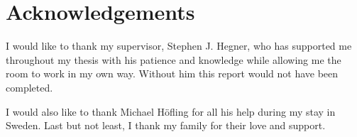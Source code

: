 \chapter{Acknowledgements}
\label{chap:acknowledgements}
I would like to thank my supervisor, Stephen J. Hegner, who has supported me 
throughout my thesis with his patience and knowledge 
while allowing me the room to work in my own way. 
Without him this report would not have been completed.

I would also like to thank Michael H\"ofling for all his help during my stay in Sweden.
Last but not least, I thank my family for their love and support.